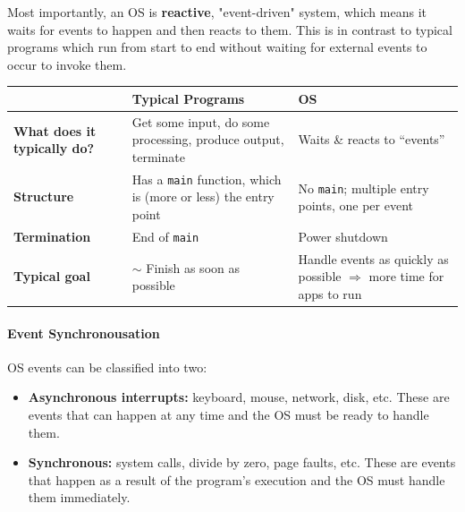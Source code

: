 \documentclass[openany,12pt]{book}
\begin{document}
\vspace{1em}
Most importantly, an OS is \textbf{reactive}, "event-driven" system, which means it waits for events to happen and then reacts to them. This is in contrast to typical programs which run from start to end without waiting for external events to occur to invoke them.

\begin{center}
    \begin{tabular}{|>{\raggedright\arraybackslash}p{4.5cm}
        |>{\raggedright\arraybackslash}p{6.5cm}
        |>{\raggedright\arraybackslash}p{5.5cm}|}
        \hline
        \rowcolor{blue!30}
         & \textbf{Typical Programs}                                                    & \textbf{OS} \\
        \hline
        \textbf{What does it typically do?}
         & Get some input, do some processing, produce output, terminate
         & Waits \& reacts to ``events''                                                              \\
        \hline
        \textbf{Structure}
         & Has a \texttt{main} function, which is (more or less) the entry point
         & No \texttt{main}; multiple entry points, one per event                                     \\
        \hline
        \textbf{Termination}
         & End of \texttt{main}
         & Power shutdown                                                                             \\
        \hline
        \textbf{Typical goal}
         & $\sim$ Finish as soon as possible
         & Handle events as quickly as possible $\Rightarrow$ more time for apps to run               \\
        \hline
    \end{tabular}
\end{center}

\paragraph{Event Synchronousation} OS events can be classified into two:
\begin{itemize}
    \item \textbf{Asynchronous interrupts:} keyboard, mouse, network, disk, etc. These are events that can happen at any time and the OS must be ready to handle them.
    \item \textbf{Synchronous:} system calls, divide by zero, page faults, etc. These are events that happen as a result of the program's execution and the OS must handle them immediately.
\end{itemize}
\end{document}
